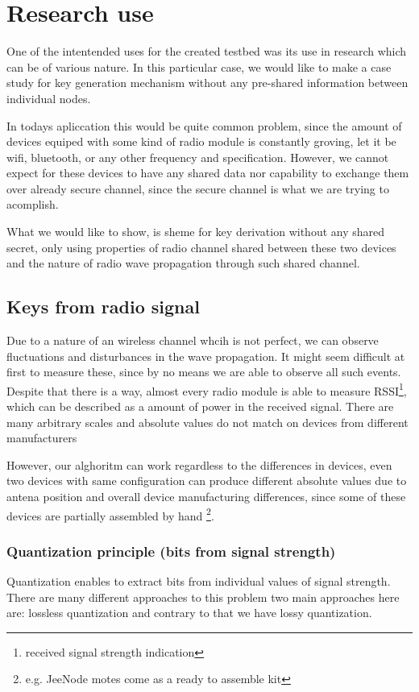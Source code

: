 \documentclass[
  digital, %
  table,   %
  nolof,     %
  nolot,     %
           oneside
]{fithesis3}
\begin{document}
  \chapter{Research use}\label{ch:research}
  One of the intentended uses for the created testbed was its use in research which can be of various nature. In this particular case, we would like to make a case study for key generation mechanism without any pre-shared information between individual nodes.

  In todays apliccation this would be quite common problem, since the amount of devices equiped with some kind of radio module is constantly groving, let it be wifi, bluetooth, or any other frequency and specification. However, we cannot expect for these devices to have any shared data nor capability to exchange them over already secure channel, since the secure channel is what we are trying to acomplish.

  What we would like to show, is sheme for key derivation without any shared secret, only using properties of radio channel shared between these two devices and the nature of radio wave propagation through such shared channel.

  \section{Keys from radio signal}
  Due to a nature of an wireless channel whcih is not perfect, we can observe fluctuations and disturbances in the wave propagation. It might seem difficult at first to measure these, since by no means we are able to observe all such events. Despite that there is a way, almost every radio module is able to measure RSSI\footnote{received signal strength indication}, which can be described as a amount of power in the received signal. There are many arbitrary scales and absolute values do not match on devices from different manufacturers %

  However, our alghoritm can work regardless to the differences in devices, even two devices with same configuration can produce different absolute values due to antena position and overall device manufacturing differences, since some of these devices are partially assembled by hand \footnote{e.g. JeeNode motes come as a ready to assemble kit}.

  \subsection{Quantization principle (bits from signal strength)}
    Quantization enables to extract bits from individual values of signal strength. There are many different approaches to this problem %
    two main approaches here are: lossless quantization %
    and contrary to that we have lossy quantization.
\end{document}
